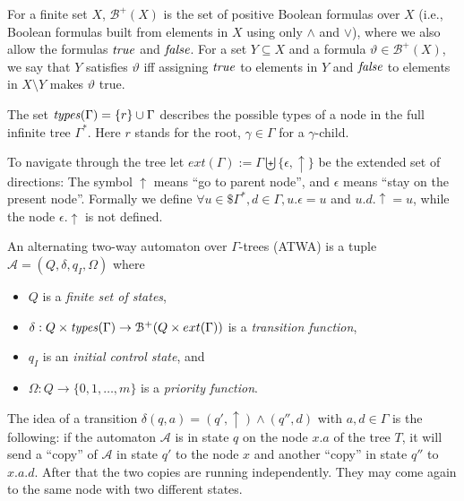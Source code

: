 \documentclass[a4paper,UKenglish,cleveref, autoref, thm-restate]{lipics-v2021}
\begin{document}
For a finite set $X$, $\mathcal{B}^+ (X)$ is the set of positive Boolean formulas
over $X$ (i.e., Boolean formulas built from elements in $X$ using only $\wedge$ and $\vee$),
where we also allow the formulas $\text{\textit{true}}$ and $\text{\textit{false}}$. For a set $Y  \subseteq  X$ and a
formula $ \vartheta   \in  \mathcal{B}^+ (X)$, we say that $Y$ satisfies $ \vartheta$  iff assigning $\text{\textit{true}}$ to elements in
$Y$ and $\text{\textit{false}}$ to elements in $X \setminus Y$ makes  $\vartheta $ true.

The set $\text{\textit{types}}(\Gamma) = \{r \} \cup \Gamma$ 
describes the possible types of a node in the full infinite tree $\Gamma^*$. 
Here $r$ stands for the root, $\gamma \in \Gamma$ for a $\gamma$-child.

To navigate through the tree let $ext(\Gamma ) := \Gamma \biguplus \{ \epsilon , \uparrow \}$ be the extended set of directions: The symbol $\uparrow$ means “go to parent node”, 
and  $\epsilon$  means “stay on the present
node”. Formally we define $ \forall u  \in \$ \Gamma^* , d  \in  \Gamma, u.\epsilon  = u$ and $u.d. \! \uparrow= u$, while the node 
$ \epsilon . \! \uparrow $ is not defined.




\begin{definition}
An alternating two-way automaton over
 $\Gamma$-trees (ATWA) is a tuple
$\mathcal{A} = (Q,  \delta , q_I , 
\Omega)$ where
\begin{itemize}
\item $Q$ is a {\em finite set of states},
\item $\delta  : Q  \times  
%
\text{\textit{types}}(\Gamma)
  \to  \mathcal{B}^+ (Q \times ext(\Gamma))$ is a {\em transition function},
\item $q_I$ is an {\em initial control state}, and
\item $\Omega: Q \to \{ 0, 1, \ldots, m\}$ is a {\em priority function}.
\end{itemize}
\end{definition}



The idea of a transition $ \delta (q, a) = ( q',\uparrow ) \wedge (q'',d)$ with $a,d\in\Gamma$ is the following: 
if the automaton
$\mathcal{A}$ is in state $q$ on the node $x.a$ of the 
tree $T$, it will send a “copy” of $\mathcal{A}$  in state $q'$ to the node $x$ and
another “copy” in state $q''$ to $x.a.d$. 
After that the two copies are
running independently. They may come again to the same node with two different
states.
\end{document}
